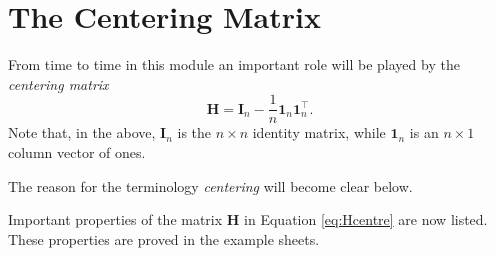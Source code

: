 \documentclass[]{book}
\theoremstyle{definition}
\theoremstyle{definition}
\theoremstyle{definition}
\theoremstyle{remark}
\begin{document}
\hypertarget{the-centering-matrix}{%
\section{The Centering Matrix}\label{the-centering-matrix}}

From time to time in this module an important role will be played by the \emph{centering matrix}
\begin{equation}
\boldsymbol H=\boldsymbol I_n - \frac{1}{n} {\mathbf 1}_n {\mathbf 1}_n^\top.
\label{eq:Hcentre}
\end{equation}
Note that, in the above, \(\boldsymbol I_n\) is the \(n \times n\) identity matrix, while \({\mathbf 1}_n\) is an \(n \times 1\) column vector of ones.

The reason for the terminology \emph{centering} will become clear below.

Important properties of the matrix \(\boldsymbol H\) in Equation \eqref{eq:Hcentre} are now listed. These properties are proved in the example sheets.
\end{document}
